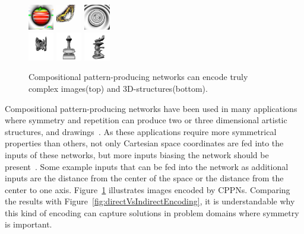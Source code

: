 \documentclass{sig-alternate}
\begin{document}
\begin{figure}[t!]
\centering
\includegraphics[width=0.1\textwidth]{../Figures/Misc/picBreed3.jpg}\quad   
\includegraphics[width=0.1\textwidth]{../Figures/Misc/picBreed2.jpg}\quad
\includegraphics[width=0.1\textwidth]{../Figures/Misc/picBreed1.jpg}\\
\includegraphics[width=0.1\textwidth]{../Figures/Misc/endless2.png}\quad 
\includegraphics[width=0.1\textwidth]{../Figures/Misc/endless1.png}\quad
\includegraphics[width=0.1\textwidth]{../Figures/Misc/endless3.png}
\caption{Compositional pattern-producing networks can encode truly complex images\protect\footnotemark[1] (top) and 3D-structures\protect\footnotemark[2] (bottom).}
\label{fig:cppnImages}
\end{figure}


Compositional pattern-producing networks have been used in many applications where symmetry and repetition can produce two or three dimensional artistic structures\footnotemark[2], and drawings\footnotemark[1]~\cite{secretan2008picbreeder}. As these applications require more symmetrical properties than others, not only Cartesian space coordinates are fed into the inputs of these networks, but more inputs biasing the network should be present~\cite{secretan2008picbreeder}. Some example inputs that can be fed into the network as additional inputs are the distance from the center of the space or the distance from the center to one axis. Figure~\ref{fig:cppnImages} illustrates images encoded by CPPNs. Comparing the results with Figure~\ref{fig:directVsIndirectEncoding}, it is understandable why this kind of encoding can capture solutions in problem domains where symmetry is important.
\end{document}

